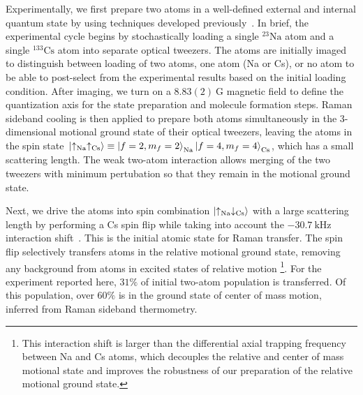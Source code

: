 \documentclass[aps,prl,twocolumn,10pt,superscriptaddress]{revtex4-1}
\newcommand{\Na}{\mathrm{Na}}
\newcommand{\Cs}{\mathrm{Cs}}
\newcommand{\todo}[1]{}
\begin{document}
Experimentally, we first prepare two atoms in a well-defined external and internal quantum state
by using techniques developed previously~\cite{Liu2018, Liu2019, Wang2019}.
In brief, the experimental cycle begins by stochastically loading a single ${}^{23}\Na$ atom
and a single ${}^{133}\Cs$ atom into separate optical tweezers.
The atoms are initially imaged to distinguish between loading of two atoms,
one atom (Na or Cs), or no atom to be able to post-select from the experimental results
based on the initial loading condition.
After imaging, we turn on a $8.83(2)~\mathrm{G}$ magnetic field to define the quantization axis
for the state preparation and molecule formation steps.
Raman sideband cooling is then applied to prepare both atoms simultaneously
in the 3-dimensional motional ground state of their optical tweezers, leaving the atoms in the spin state~$\ket{\uparrow_{\Na}\uparrow_{\Cs}}\equiv \ket{f=2,m_f=2}_{\Na}\ket{f=4,m_f=4}_{\Cs}$,
which has a small scattering length.
The weak two-atom interaction allows merging of the two tweezers with minimum pertubation so that they remain in the motional ground state.

Next, we drive the atoms into spin combination $\ket{\uparrow_{\Na} \downarrow_{\Cs}}$ with a large scattering length
by performing a Cs spin flip while taking into account
the $-30.7~\mathrm{kHz}$ interaction shift~\cite{Hood2019}.
This is the initial atomic state for Raman transfer.
The spin flip selectively transfers atoms in the relative motional ground state,
removing any background from atoms in excited states of relative motion
\footnote{This interaction shift is larger than the differential axial trapping frequency
  between Na and Cs atoms, which decouples the relative and center of mass motional state
  and improves the robustness of our preparation of the relative motional ground state.}.
For the experiment reported here,
$31\mathrm{\%}$ of initial two-atom population is transferred. Of this population, over $60\%$ is in the ground state of center of mass motion, inferred from Raman sideband thermometry. %
\end{document}
